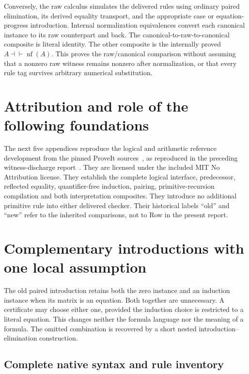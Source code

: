 \documentclass[11pt,letterpaper]{article}
\theoremstyle{definition}\newtheorem{definition}[theorem]{Definition}
\theoremstyle{remark}\newtheorem{remark}[theorem]{Remark}
\newcommand{\nf}{\operatorname{nf}}
\begin{document}
Conversely, the raw calculus simulates the delivered rules using ordinary
paired elimination, its derived equality transport, and the appropriate case
or equation-progress introduction. Internal normalization equivalences
convert each canonical instance to its raw counterpart and back. The
canonical-to-raw-to-canonical composite is literal identity. The other
composite is the internally proved $A\dashv\vdash\nf(A)$. This proves the
raw/canonical comparison without assuming that a nonzero raw witness remains
nonzero after normalization, or that every rule tag survives arbitrary
numerical substitution.

\clearpage
\section*{Attribution and role of the following foundations}
The next five appendices reproduce the logical and arithmetic reference
development from the pinned ProveIt sources~\cite{choice,erasure,forward,progress},
as reproduced in the preceding witness-discharge report~\cite{prior}.
They are licensed under the included MIT No Attribution license. They
establish the complete logical interface, predecessor, reflected equality,
quantifier-free induction, pairing, primitive-recursion compilation and both
interpretation composites. They introduce no additional primitive rule into
either delivered checker. Their historical labels ``old'' and ``new'' refer
to the inherited comparisons, not to Row in the present report.


\section{Complementary introductions with one local assumption}
\label{sec:choice-introduction}

The old paired introduction retains both the zero instance and an
induction instance when its matrix is an equation. Both together are
unnecessary. A certificate may choose either one, provided the induction
choice is restricted to a literal equation. This changes neither the
formula language nor the meaning of a formula. The omitted combination
is recovered by a short nested introduction--elimination construction.

\subsection{Complete native syntax and rule inventory}
\end{document}
